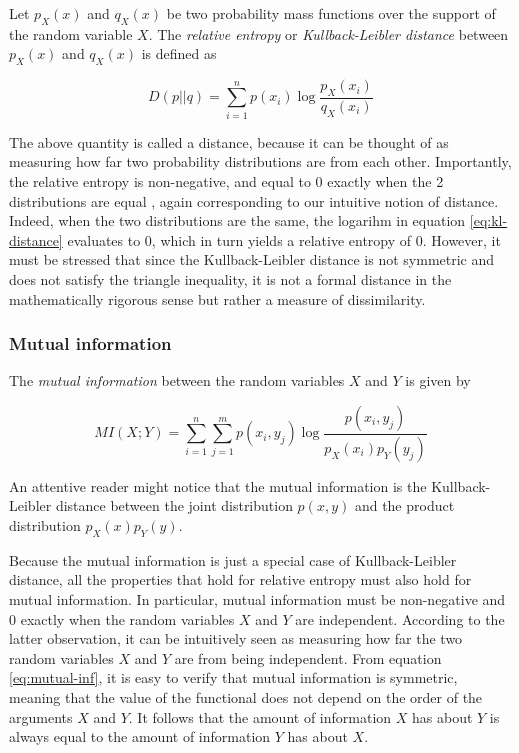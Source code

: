 \documentclass[12pt]{article}
\begin{document}
Let $p_X(x)$ and $q_X(x)$ be two probability mass functions over the support of the random variable $X$. The \textit{relative entropy} or \textit{Kullback-Leibler distance} \cite{cover-thomas} between $p_X(x)$ and $q_X(x)$ is defined as

\begin{equation}
D(p||q) = \sum_{i = 1}^n p(x_i) \log \frac{p_X(x_i)}{q_X(x_i)}
\label{eq:kl-distance}
\end{equation} 

The above quantity is called a distance, because it can be thought of as measuring how far two probability distributions are from each other. Importantly, the relative entropy is non-negative, and equal to 0 exactly when the 2 distributions are equal \cite{cover-thomas}, again corresponding to our intuitive notion of distance. Indeed, when the two distributions are the same, the logarihm in equation \ref{eq:kl-distance} evaluates to 0, which in turn yields a relative entropy of 0. However, it must be stressed that since the Kullback-Leibler distance is not symmetric and does not satisfy the triangle inequality, it is not a formal distance in the mathematically rigorous sense but rather a measure of dissimilarity.

\subsubsection{Mutual information}

The \textit{mutual information} \cite{cover-thomas} between the random variables $X$ and $Y$ is given by 

\begin{equation}
MI(X;Y) = \sum_{i=1}^n \sum_{j=1}^m p(x_i,y_j) \log \frac{p(x_i,y_j)}{p_X(x_i)p_Y(y_j)}
\label{eq:mutual-inf}
\end{equation}

An attentive reader might notice that the mutual information is the Kullback-Leibler distance between the joint distribution $p(x,y)$ and the product distribution $p_X(x)p_Y(y)$.

Because the mutual information is just a special case of Kullback-Leibler distance, all the properties that hold for relative entropy must also hold for mutual information. In particular, mutual information must be non-negative and 0 exactly when the random variables $X$ and $Y$ are independent. According to the latter observation, it can be intuitively seen as measuring how far the two random variables $X$ and $Y$ are from being independent. From equation \ref{eq:mutual-inf}, it is easy to verify that mutual information is symmetric, meaning that the value of the functional does not depend on the order of the arguments $X$ and $Y$. It follows that the amount of information $X$ has about $Y$ is always equal to the amount of information $Y$ has about $X$. 
\end{document}
